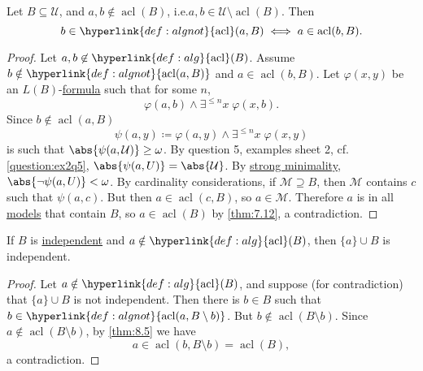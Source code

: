 \documentclass{article}
\DeclareMathOperator{\acl}{acl}
\newcommand{\named}[1]{\textbf{#1}\index{#1}}
\begin{document}
\begin{nthm}\label{thm:8.5}
  Let $B \subseteq \mathcal{U}$, and $a,b \notin \acl(B)$, i.e.\@ $a,b \in \mathcal{U} \setminus \acl(B)$.
  Then
  \begin{equation*}
    b \in \hyperlink{def:algnot}{\acl}(a,B) \iff a \in \acl(b,B).
  \end{equation*}
\end{nthm}
\begin{proof}
  Let $a,b \not\in \hyperlink{def:alg}{\acl}(B)$. Assume $b \notin \hyperlink{def:algnot}{\acl(a,B)}$ and $a \in \acl(b,B)$.
  Let $\varphi(x,y)$ be an $L(B)$-\hyperlink{def:form}{formula} such that for some $n$,
  \begin{equation*}
    \varphi(a,b) \land \exists^{\leq n} x \; \varphi(x,b).
  \end{equation*}
  Since $b \notin \acl(a,B)$
  \begin{equation*}
    \psi(a,y) \coloneqq \varphi(a,y) \land \exists^{\leq n} x \; \varphi(x,y)
  \end{equation*}
  is such that $\abs{\psi(a,\mathcal{U})} \geq \omega$.
  By question 5, examples sheet 2, cf.\@ \cref{question:ex2q5}, $\abs{\psi(a,U)} = \abs{\mathcal{U}}$.
  By \hyperlink{def:minimal}{strong minimality}, $\abs{\neg \psi(a,U)} < \omega$.
  By cardinality considerations, if $\mathcal{M} \supseteq B$, then $\mathcal{M}$ contains $c$ such that $\psi(a,c)$.
  But then $a \in \acl(c,B)$, so $a \in \mathcal{M}$.
  Therefore $a$ is in all \hyperlink{def:model}{models} that contain $B$, so $a \in \acl(B)$ by \cref{thm:7.12}, a contradiction.
\end{proof}
\begin{nlemma}\label{lem:8.7}
  If $B$ is \hyperlink{def:indep}{independent} and $a \notin \hyperlink{def:alg}{\acl}(B)$, then $\{a\} \cup B$ is independent.
\end{nlemma}
\begin{proof}
  Let $a \notin \hyperlink{def:alg}{\acl}(B)$, and suppose (for contradiction) that $\{a\} \cup B$ is not independent.
  Then there is $b \in B$ such that $b \in \hyperlink{def:algnot}{\acl(a, B\setminus b)}$.
  But $b \notin \acl(B \setminus b)$. Since $a \notin \acl(B \setminus b)$, by \cref{thm:8.5} we have
  \begin{equation*}
    a \in \acl(b, B \setminus b) = \acl(B),
  \end{equation*}
  a contradiction.
\end{proof}
\end{document}
